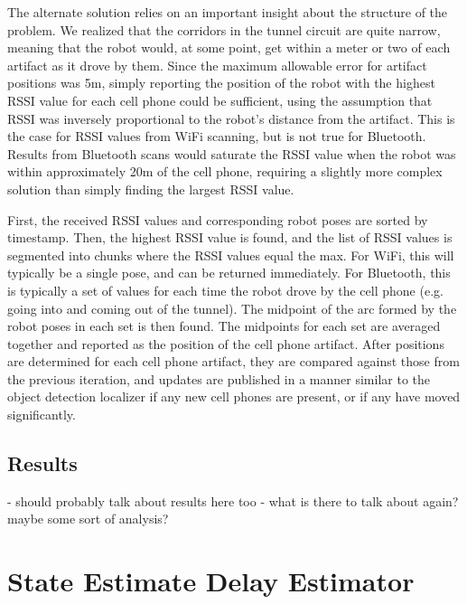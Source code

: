 \begin{description}
	The alternate solution relies on an important insight about the structure of the problem. We realized that the corridors in the tunnel circuit are quite narrow, meaning that the robot would, at some point, get within a meter or two of each artifact as it drove by them. Since the maximum allowable error for artifact positions was 5m, simply reporting the position of the robot with the highest RSSI value for each cell phone could be sufficient, using the assumption that RSSI was inversely proportional to the robot's distance from the artifact. This is the case for RSSI values from WiFi scanning, but is not true for Bluetooth. Results from Bluetooth scans would saturate the RSSI value when the robot was within approximately 20m of the cell phone, requiring a slightly more complex solution than simply finding the largest RSSI value.
	
	First, the received RSSI values and corresponding robot poses are sorted by timestamp. Then, the highest RSSI value is found, and the list of RSSI values is segmented into chunks where the RSSI values equal the max. For WiFi, this will typically be a single pose, and can be returned immediately. For Bluetooth, this is typically a set of values for each time the robot drove by the cell phone (e.g. going into and coming out of the tunnel). The midpoint of the arc formed by the robot poses in each set is then found. The midpoints for each set are averaged together and reported as the position of the cell phone artifact. After positions are determined for each cell phone artifact, they are compared against those from the previous iteration, and updates are published in a manner similar to the object detection localizer if any new cell phones are present, or if any have moved significantly.
		
\end{description}

\subsection{Results}

- should probably talk about results here too
- what is there to talk about again? maybe some sort of analysis?

\section{State Estimate Delay Estimator}

